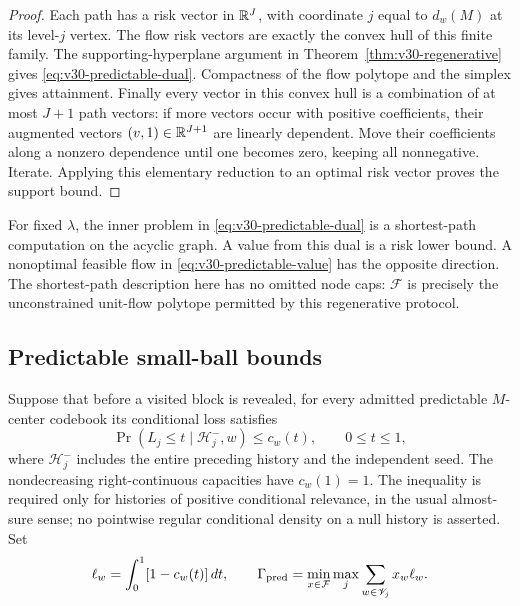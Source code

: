 \begin{proof}
Each path has a risk vector in $\mathbb R^J$, with coordinate $j$ equal to
$d_w(M)$ at its level-$j$ vertex. The flow risk vectors are exactly
the convex hull of this finite family. The supporting-hyperplane
argument in Theorem~\ref{thm:v30-regenerative} gives
\eqref{eq:v30-predictable-dual}. Compactness of the flow polytope
and the simplex gives attainment. Finally every vector in this
convex hull is a combination of at most $J+1$ path vectors: if more
vectors occur with positive coefficients, their augmented vectors
$(v,1)\in\mathbb R^{J+1}$ are linearly dependent. Move their coefficients
along a nonzero dependence until one becomes zero, keeping all
nonnegative. Iterate. Applying this elementary reduction to an
optimal risk vector proves the support bound.
\end{proof}

For fixed $\lambda$, the inner problem in
\eqref{eq:v30-predictable-dual} is a shortest-path computation on the
acyclic graph. A value from this dual is a risk lower bound. A
nonoptimal feasible flow in \eqref{eq:v30-predictable-value} has the
opposite direction. The shortest-path description here has no omitted
node caps: $\mathcal F$ is precisely the unconstrained unit-flow
polytope permitted by this regenerative protocol.

\subsection{Predictable small-ball bounds}
Suppose that before a visited block is revealed, for every admitted
predictable $M$-center codebook its conditional loss satisfies
\begin{equation}\label{eq:v30-predictable-capacity}
 \Pr(L_j\le t\mid\mathcal H_j^-,w)\le c_w(t),
                       \qquad 0\le t\le1,
\end{equation}
where $\mathcal H_j^-$ includes the entire preceding history and the
independent seed. The nondecreasing right-continuous capacities have
$c_w(1)=1$. The inequality is required only for histories of positive
conditional relevance, in the usual almost-sure sense; no pointwise
regular conditional density on a null history is asserted. Set
\[
 \ell_w=\int_0^1[1-c_w(t)]\,dt,\qquad
 \Gamma_{\rm pred}=
      \min_{x\in\mathcal F}\max_j\sum_{w\in\mathscr V_j}x_w\ell_w.
\]

